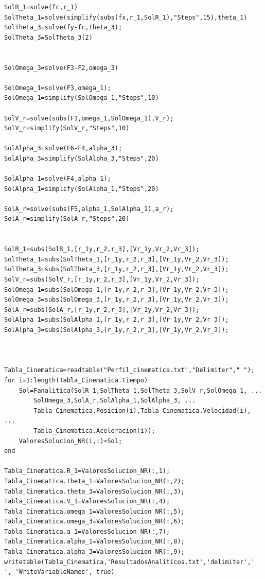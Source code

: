 \documentclass[12pt]{article}
\begin{document}
\begin{lstlisting}
SolR_1=solve(fc,r_1)
SolTheta_1=solve(simplify(subs(fx,r_1,SolR_1),"Steps",15),theta_1)
SolTheta_3=solve(fy-fc,theta_3);
SolTheta_3=SolTheta_3(2)


SolOmega_3=solve(F3-F2,omega_3)

SolOmega_1=solve(F3,omega_1);
SolOmega_1=simplify(SolOmega_1,"Steps",10)

SolV_r=solve(subs(F1,omega_1,SolOmega_1),V_r);
SolV_r=simplify(SolV_r,"Steps",10)

SolAlpha_3=solve(F6-F4,alpha_3);
SolAlpha_3=simplify(SolAlpha_3,"Steps",20)

SolAlpha_1=solve(F4,alpha_1);
SolAlpha_1=simplify(SolAlpha_1,"Steps",20)

SolA_r=solve(subs(F5,alpha_1,SolAlpha_1),a_r);
SolA_r=simplify(SolA_r,"Steps",20)


SolR_1=subs(SolR_1,[r_1y,r_2,r_3],[Vr_1y,Vr_2,Vr_3]);
SolTheta_1=subs(SolTheta_1,[r_1y,r_2,r_3],[Vr_1y,Vr_2,Vr_3]);
SolTheta_3=subs(SolTheta_3,[r_1y,r_2,r_3],[Vr_1y,Vr_2,Vr_3]);
SolV_r=subs(SolV_r,[r_1y,r_2,r_3],[Vr_1y,Vr_2,Vr_3]);
SolOmega_1=subs(SolOmega_1,[r_1y,r_2,r_3],[Vr_1y,Vr_2,Vr_3]);
SolOmega_3=subs(SolOmega_3,[r_1y,r_2,r_3],[Vr_1y,Vr_2,Vr_3]);
SolA_r=subs(SolA_r,[r_1y,r_2,r_3],[Vr_1y,Vr_2,Vr_3]);
SolAlpha_1=subs(SolAlpha_1,[r_1y,r_2,r_3],[Vr_1y,Vr_2,Vr_3]);
SolAlpha_3=subs(SolAlpha_3,[r_1y,r_2,r_3],[Vr_1y,Vr_2,Vr_3]);



Tabla_Cinematica=readtable("Perfil_cinematica.txt","Delimiter"," ");
for i=1:length(Tabla_Cinematica.Tiempo) 
    Sol=Fanalitica(SolR_1,SolTheta_1,SolTheta_3,SolV_r,SolOmega_1, ...
        SolOmega_3,SolA_r,SolAlpha_1,SolAlpha_3, ...
        Tabla_Cinematica.Posicion(i),Tabla_Cinematica.Velocidad(i), ...
        Tabla_Cinematica.Aceleracion(i));
    ValoresSolucion_NR(i,:)=Sol;
end

Tabla_Cinematica.R_1=ValoresSolucion_NR(:,1);
Tabla_Cinematica.theta_1=ValoresSolucion_NR(:,2);
Tabla_Cinematica.theta_3=ValoresSolucion_NR(:,3);
Tabla_Cinematica.V_1=ValoresSolucion_NR(:,4);
Tabla_Cinematica.omega_1=ValoresSolucion_NR(:,5);
Tabla_Cinematica.omega_3=ValoresSolucion_NR(:,6);
Tabla_Cinematica.a_1=ValoresSolucion_NR(:,7);
Tabla_Cinematica.alpha_1=ValoresSolucion_NR(:,8);
Tabla_Cinematica.alpha_3=ValoresSolucion_NR(:,9);
writetable(Tabla_Cinematica,'ResultadosAnaliticos.txt','delimiter',' ', 'WriteVariableNames', true)



\end{lstlisting}
\end{document}
